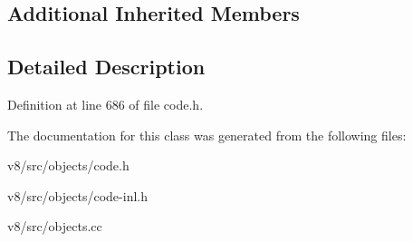 \subsection*{Additional Inherited Members}


\subsection{Detailed Description}


Definition at line 686 of file code.\+h.



The documentation for this class was generated from the following files\+:\begin{DoxyCompactItemize}
\item 
v8/src/objects/code.\+h\item 
v8/src/objects/code-\/inl.\+h\item 
v8/src/objects.\+cc\end{DoxyCompactItemize}
